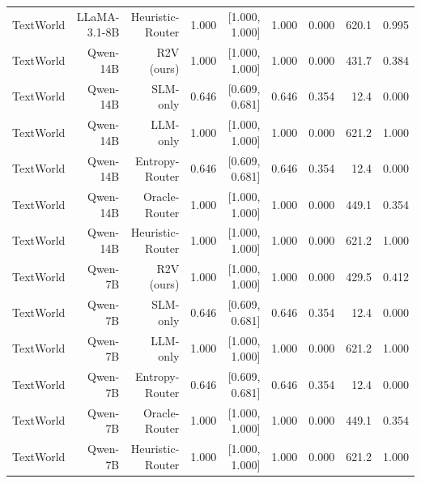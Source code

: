 \begin{table}[t]
\begin{tabular}{lrrrrrrrr}
TextWorld & LLaMA-3.1-8B & Heuristic-Router & 1.000 & [1.000, 1.000] & 1.000 & 0.000 & 620.1 & 0.995 \\
TextWorld & Qwen-14B & R2V (ours) & 1.000 & [1.000, 1.000] & 1.000 & 0.000 & 431.7 & 0.384 \\
TextWorld & Qwen-14B & SLM-only & 0.646 & [0.609, 0.681] & 0.646 & 0.354 & 12.4 & 0.000 \\
TextWorld & Qwen-14B & LLM-only & 1.000 & [1.000, 1.000] & 1.000 & 0.000 & 621.2 & 1.000 \\
TextWorld & Qwen-14B & Entropy-Router & 0.646 & [0.609, 0.681] & 0.646 & 0.354 & 12.4 & 0.000 \\
TextWorld & Qwen-14B & Oracle-Router & 1.000 & [1.000, 1.000] & 1.000 & 0.000 & 449.1 & 0.354 \\
TextWorld & Qwen-14B & Heuristic-Router & 1.000 & [1.000, 1.000] & 1.000 & 0.000 & 621.2 & 1.000 \\
TextWorld & Qwen-7B & R2V (ours) & 1.000 & [1.000, 1.000] & 1.000 & 0.000 & 429.5 & 0.412 \\
TextWorld & Qwen-7B & SLM-only & 0.646 & [0.609, 0.681] & 0.646 & 0.354 & 12.4 & 0.000 \\
TextWorld & Qwen-7B & LLM-only & 1.000 & [1.000, 1.000] & 1.000 & 0.000 & 621.2 & 1.000 \\
TextWorld & Qwen-7B & Entropy-Router & 0.646 & [0.609, 0.681] & 0.646 & 0.354 & 12.4 & 0.000 \\
TextWorld & Qwen-7B & Oracle-Router & 1.000 & [1.000, 1.000] & 1.000 & 0.000 & 449.1 & 0.354 \\
TextWorld & Qwen-7B & Heuristic-Router & 1.000 & [1.000, 1.000] & 1.000 & 0.000 & 621.2 & 1.000 \\
\hline
\end{tabular}
\end{table}
